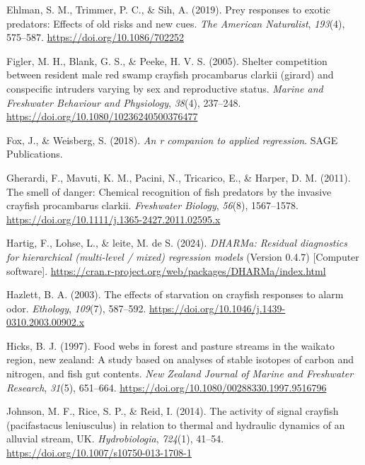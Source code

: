 \documentclass[
  letterpaper,
  DIV=11,
  numbers=noendperiod]{scrartcl}
\newlength{\cslhangindent}
\newenvironment{CSLReferences}[2] %
 {\begin{list}{}{%
  \setlength{\itemindent}{0pt}
  \setlength{\leftmargin}{0pt}
  \setlength{\parsep}{0pt}
  \ifodd #1
   \setlength{\leftmargin}{\cslhangindent}
   \setlength{\itemindent}{-1\cslhangindent}
  \fi
  \setlength{\itemsep}{#2\baselineskip}}}
 {\end{list}}
\begin{document}
\begin{CSLReferences}{1}{0}
Ehlman, S. M., Trimmer, P. C., \& Sih, A. (2019). Prey responses to
exotic predators: Effects of old risks and new cues. \emph{The American
Naturalist}, \emph{193}(4), 575--587.
\url{https://doi.org/10.1086/702252}

Figler, M. H., Blank, G. S., \& Peeke, H. V. S. (2005). Shelter
competition between resident male red swamp crayfish procambarus clarkii
(girard) and conspecific intruders varying by sex and reproductive
status. \emph{Marine and Freshwater Behaviour and Physiology},
\emph{38}(4), 237--248. \url{https://doi.org/10.1080/10236240500376477}

Fox, J., \& Weisberg, S. (2018). \emph{An r companion to applied
regression}. SAGE Publications.

Gherardi, F., Mavuti, K. M., Pacini, N., Tricarico, E., \& Harper, D. M.
(2011). The smell of danger: Chemical recognition of fish predators by
the invasive crayfish procambarus clarkii. \emph{Freshwater Biology},
\emph{56}(8), 1567--1578.
\url{https://doi.org/10.1111/j.1365-2427.2011.02595.x}

{Hartig, F., Lohse, L., \& leite, M. de S.} (2024). \emph{DHARMa:
Residual diagnostics for hierarchical (multi-level / mixed) regression
models} (Version 0.4.7) {[}Computer software{]}.
\url{https://cran.r-project.org/web/packages/DHARMa/index.html}

Hazlett, B. A. (2003). The effects of starvation on crayfish responses
to alarm odor. \emph{Ethology}, \emph{109}(7), 587--592.
\url{https://doi.org/10.1046/j.1439-0310.2003.00902.x}

Hicks, B. J. (1997). Food webs in forest and pasture streams in the
waikato region, new zealand: A study based on analyses of stable
isotopes of carbon and nitrogen, and fish gut contents. \emph{New
Zealand Journal of Marine and Freshwater Research}, \emph{31}(5),
651--664. \url{https://doi.org/10.1080/00288330.1997.9516796}

Johnson, M. F., Rice, S. P., \& Reid, I. (2014). The activity of signal
crayfish (pacifastacus leniusculus) in relation to thermal and hydraulic
dynamics of an alluvial stream, UK. \emph{Hydrobiologia}, \emph{724}(1),
41--54. \url{https://doi.org/10.1007/s10750-013-1708-1}


\end{CSLReferences}
\end{document}
